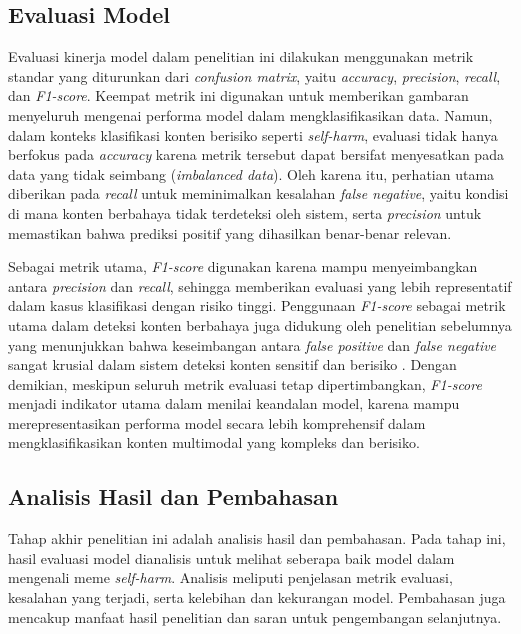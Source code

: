 \subsection{Evaluasi Model} \label{subsec:evaluasi_model}
Evaluasi kinerja model dalam penelitian ini dilakukan menggunakan metrik standar yang diturunkan dari \textit{confusion matrix}, yaitu \textit{accuracy}, \textit{precision}, \textit{recall}, dan \textit{F1-score}. Keempat metrik ini digunakan untuk memberikan gambaran menyeluruh mengenai performa model dalam mengklasifikasikan data. Namun, dalam konteks klasifikasi konten berisiko seperti \textit{self-harm}, evaluasi tidak hanya berfokus pada \textit{accuracy} karena metrik tersebut dapat bersifat menyesatkan pada data yang tidak seimbang (\textit{imbalanced data}). Oleh karena itu, perhatian utama diberikan pada \textit{recall} untuk meminimalkan kesalahan \textit{false negative}, yaitu kondisi di mana konten berbahaya tidak terdeteksi oleh sistem, serta \textit{precision} untuk memastikan bahwa prediksi positif yang dihasilkan benar-benar relevan.

Sebagai metrik utama, \textit{F1-score} digunakan karena mampu menyeimbangkan antara \textit{precision} dan \textit{recall}, sehingga memberikan evaluasi yang lebih representatif dalam kasus klasifikasi dengan risiko tinggi. Penggunaan \textit{F1-score} sebagai metrik utama dalam deteksi konten berbahaya juga didukung oleh penelitian sebelumnya yang menunjukkan bahwa keseimbangan antara \textit{false positive} dan \textit{false negative} sangat krusial dalam sistem deteksi konten sensitif dan berisiko \cite{Sokolova2009Performance, Sharma2022HarmfulMemes}. Dengan demikian, meskipun seluruh metrik evaluasi tetap dipertimbangkan, \textit{F1-score} menjadi indikator utama dalam menilai keandalan model, karena mampu merepresentasikan performa model secara lebih komprehensif dalam mengklasifikasikan konten multimodal yang kompleks dan berisiko.

\subsection{Analisis Hasil dan Pembahasan} \label{subsec:analisis_hasil_dan_pembahasan}
Tahap akhir penelitian ini adalah analisis hasil dan pembahasan. Pada tahap ini, hasil evaluasi model dianalisis untuk melihat seberapa baik model dalam mengenali meme \textit{self-harm}. Analisis meliputi penjelasan metrik evaluasi, kesalahan yang terjadi, serta kelebihan dan kekurangan model. Pembahasan juga mencakup manfaat hasil penelitian dan saran untuk pengembangan selanjutnya. \par


